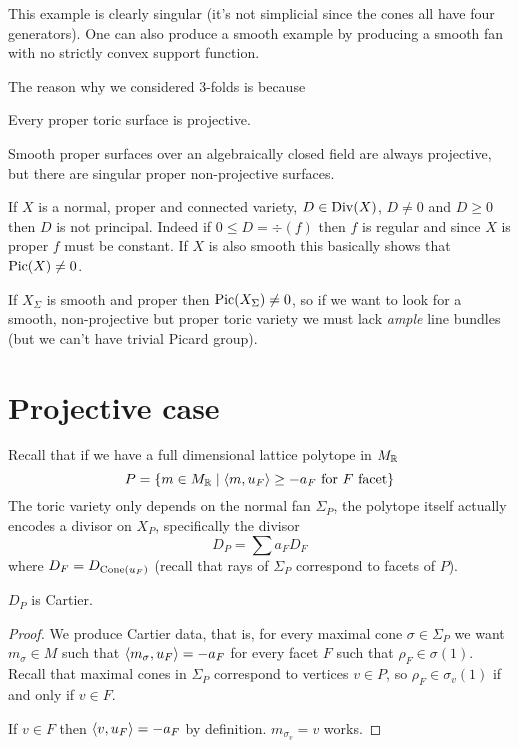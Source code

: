 \begin{remark}
This example is clearly singular (it's not simplicial since the cones all have four generators). One can also produce a smooth example by producing a smooth fan with no strictly convex support function.
\end{remark}

The reason why we considered 3-folds is because

\begin{fact}[]
Every proper toric surface is projective.
\end{fact}

\begin{fact}[]
Smooth proper surfaces over an algebraically closed field are always projective, but there are singular proper non-projective surfaces.
\end{fact}


\begin{remark}[]
If $X$ is a normal, proper and connected variety, $D\in \operatorname{Div}(X)$, $D\neq 0$ and $D\geq 0$ then $D$ is not principal. Indeed if $0\leq D=\div(f)$ then $f$ is regular and since $X$ is proper $f$ must be constant.
If $X$ is also smooth this basically shows that $\operatorname{Pic}(X)\neq 0$.
\end{remark}

\begin{remark}
If $X_\Sigma$ is smooth and proper then $\operatorname{Pic}(X_\Sigma)\neq 0$, so if we want to look for a smooth, non-projective but proper toric variety we must lack \textit{ample} line bundles (but we can't have trivial Picard group).
\end{remark}


\section{Projective case}
Recall that if we have a full dimensional lattice polytope in $M_{\mathbb{R}}$
\[P=\left\{{m\in M_{\mathbb{R}}\mid \left\langle {m,u_F}\right\rangle\geq -a_F\text{ for $F$ facet}}\right\}\]
The toric variety only depends on the normal fan $\Sigma_P$, the polytope itself actually encodes a divisor on $X_P$, specifically the divisor
\[D_P=\sum a_F D_{F}\]
where $D_F=D_{\operatorname{Cone}(u_F)}$ (recall that rays of $\Sigma_P$ correspond to facets of $P$).

\begin{proposition}[]\label{PrPolytopeGivesCartierDivisor}
$D_P$ is Cartier.
\end{proposition}
\begin{proof}
We produce Cartier data, that is, for every maximal cone $\sigma\in \Sigma_P$ we want $m_\sigma\in M$ such that $\left\langle {m_\sigma,u_F}\right\rangle=-a_F$ for every facet $F$ such that $\rho_F\in \sigma(1)$. Recall that maximal cones in $\Sigma_P$ correspond to vertices $v\in P$, so $\rho_F\in \sigma_v(1)$ if and only if $v\in F$.

If $v\in F$ then $\left\langle {v,u_F}\right\rangle=-a_F$ by definition. $m_{\sigma_v}=v$ works.
\end{proof}

